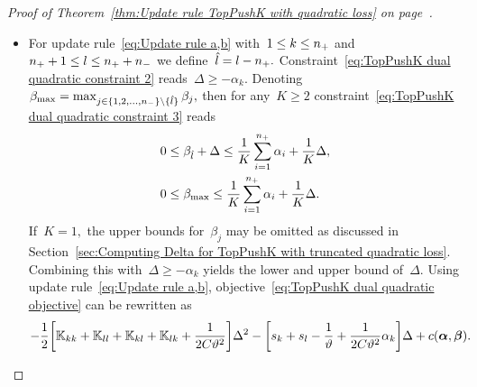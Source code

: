 \begin{proof}[Proof of Theorem~\ref{thm:Update rule TopPushK with quadratic loss} on page~\pageref{thm:Update rule TopPushK with quadratic loss}]
\begin{itemize}
    \item For update rule~\eqref{eq:Update rule a,b} with~$1 \le k \le n_{+}$ and~$n_{+} + 1 \le l \le n_{+} + n_{-}$ we define~$\hat{l} = l - n_{+}.$ Constraint~\eqref{eq:TopPushK dual quadratic constraint 2} reads~$\Delta \geq - \alpha_k.$ Denoting~$\beta_{\max} = \max_{j \in \{1, 2, \ldots, n_{-} \} \setminus \{\hat l\}} \beta_j,$ then for any~$K \geq 2$ constraint~\eqref{eq:TopPushK dual quadratic constraint 3} reads
    \begin{equation}\label{eq: TopPushK dual quadratic a,b - bounds}
      \begin{aligned}
        0 & \leq \beta_{\hat{l}} + \Delta \leq \frac{1}{K} \sum_{i = 1}^{n_{+}} \alpha_i + \frac{1}{K} \Delta, \\
        0 & \leq \beta_{\max} \leq \frac{1}{K} \sum_{i = 1}^{n_{+}} \alpha_i + \frac{1}{K} \Delta.
      \end{aligned}
    \end{equation}
    If~$K = 1,$ the upper bounds for~$\beta_j$ may be omitted as discussed in Section~\ref{sec:Computing Delta for TopPushK with truncated quadratic loss}. Combining this with~$\Delta \geq - \alpha_k$ yields the lower and upper bound of~$\Delta.$ Using update rule~\eqref{eq:Update rule a,b}, objective~\eqref{eq:TopPushK dual quadratic objective} can be rewritten as
    \begin{equation*}
      - \frac{1}{2} \Brac[s]{\K_{kk} + \K_{ll} + \K_{kl} + \K_{lk} + \frac{1}{2C\vartheta^2}} \Delta^2 - \Brac[s]{s_k + s_l - \frac{1}{\vartheta} + \frac{1}{2C\vartheta^2} \alpha_k} \Delta + c(\bm{\alpha}, \bm{\beta}).
    \end{equation*}


\end{itemize}
\end{proof}
